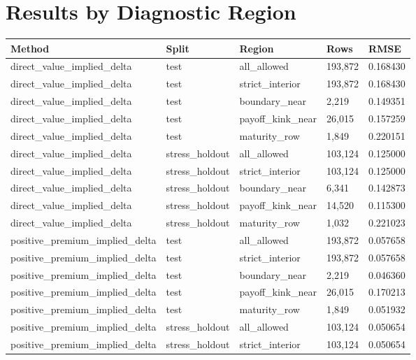 \documentclass[11pt,a4paper]{article}
\begin{document}
\section{Results by Diagnostic Region}

\begin{longtable}{L{0.25\textwidth} L{0.16\textwidth} L{0.19\textwidth} L{0.12\textwidth} L{0.13\textwidth}}
\toprule
Method & Split & Region & Rows & RMSE \\
\midrule
\endhead
direct\_value\_implied\_delta & test & all\_allowed & 193,872 & 0.168430 \\
direct\_value\_implied\_delta & test & strict\_interior & 193,872 & 0.168430 \\
direct\_value\_implied\_delta & test & boundary\_near & 2,219 & 0.149351 \\
direct\_value\_implied\_delta & test & payoff\_kink\_near & 26,015 & 0.157259 \\
direct\_value\_implied\_delta & test & maturity\_row & 1,849 & 0.220151 \\
direct\_value\_implied\_delta & stress\_holdout & all\_allowed & 103,124 & 0.125000 \\
direct\_value\_implied\_delta & stress\_holdout & strict\_interior & 103,124 & 0.125000 \\
direct\_value\_implied\_delta & stress\_holdout & boundary\_near & 6,341 & 0.142873 \\
direct\_value\_implied\_delta & stress\_holdout & payoff\_kink\_near & 14,520 & 0.115300 \\
direct\_value\_implied\_delta & stress\_holdout & maturity\_row & 1,032 & 0.221023 \\
positive\_premium\_implied\_delta & test & all\_allowed & 193,872 & 0.057658 \\
positive\_premium\_implied\_delta & test & strict\_interior & 193,872 & 0.057658 \\
positive\_premium\_implied\_delta & test & boundary\_near & 2,219 & 0.046360 \\
positive\_premium\_implied\_delta & test & payoff\_kink\_near & 26,015 & 0.170213 \\
positive\_premium\_implied\_delta & test & maturity\_row & 1,849 & 0.051932 \\
positive\_premium\_implied\_delta & stress\_holdout & all\_allowed & 103,124 & 0.050654 \\
positive\_premium\_implied\_delta & stress\_holdout & strict\_interior & 103,124 & 0.050654 \\

\end{longtable}
\end{document}
